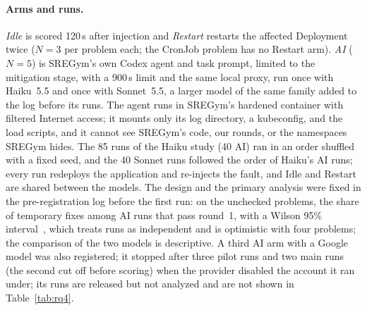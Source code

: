 \paragraph{Arms and runs.} \emph{Idle} is scored 120\,s after injection and \emph{Restart} restarts the affected
Deployment twice ($N=3$ per problem each; the CronJob problem has no Restart arm). \emph{AI} ($N=5$) is SREGym's own
Codex agent and task prompt, limited to the mitigation stage, with a 900\,s limit and the same local proxy, run once with
Haiku~5.5 and once with Sonnet~5.5, a larger model of the same family added to the log before its runs. The agent runs
in SREGym's hardened container with filtered Internet access; it mounts only its log directory, a kubeconfig, and the
load scripts, and it cannot see SREGym's code, our rounds, or the namespaces SREGym hides. The 85 runs of the Haiku study
(40 AI) ran in an order shuffled with a fixed seed, and the 40 Sonnet runs followed the order of Haiku's AI runs; every run
redeploys the application and re-injects the fault, and Idle and Restart are shared between the models. The design and
the primary analysis were fixed in the pre-registration log before the first run: on the unchecked problems, the share of temporary
fixes among AI runs that pass round~1, with a Wilson 95\% interval~\citep{wilson1927}, which treats runs as independent and is optimistic with four problems; the comparison of the two models
is descriptive. A third AI arm with a Google model was also registered; it stopped after three pilot runs and two main runs
(the second cut off before scoring) when the provider disabled the account it ran under; its runs are released but not
analyzed and are not shown in Table~\ref{tab:rq4}.


\begin{table}[t]
\centering\scriptsize
\caption{SREGym-Lite runs by problem and arm (RQ3). \emph{Temporary}: SREGym's oracle accepts, round~2 or~3 fails;
\emph{durable}: every round the problem has passes. No run was flagged \emph{peek} or left unscored.}\label{tab:rq4}
\fittable{}
\end{table}

